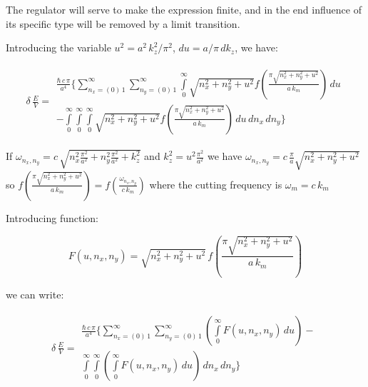 \documentclass[11pt]{article}
\begin{document}
    The regulator will serve to make the expression finite, and in the end
influence of its specific type will be removed by a limit transition.

    Introducing the variable \(u^2 = a^2\,k_z^2/\pi^2\),
\(du = a/\pi\,dk_z\), we have:

    \begin{equation}
\begin{array}{lr}
\delta\,\frac{E}{V} =
\begin{array}{c}
\frac{\hbar\,c\,\pi}{a^4}\Bigg\{
\sum\limits_{n_x=\left(0\right)\,1}^{\infty}
\sum\limits_{n_y=\left(0\right)\,1}^{\infty}
\int\limits_{0}^{\infty}
{\sqrt{n_x^2 + n_y^2 + u^2}}
f\left(\frac{\pi\sqrt{n_x^2 + n_y^2 + u^2}}{a\,k_m}\right)
\,d{u} \\
- \int\limits_{0}^{\infty}
\int\limits_{0}^{\infty}
\int\limits_{0}^{\infty}
{\sqrt{n_x^2 + n_y^2 + u^2}}
f\left(\frac{\pi\sqrt{n_x^2 + n_y^2 + u^2}}{a\,k_m}\right)
\,d{u}\,d{n_x}\,d{n_y}
\Bigg\}
\end{array}
\end{array}
\end{equation}

    If
\(\omega _{n_x,n_y} = c\,\sqrt{n_x^2\frac{\pi^2}{a^2}+n_y^2\frac{\pi^2}{a^2}+k_z^2}\)
and \(k_z^2 = u^2 \frac{\pi^2}{a^2}\) we have
\(\omega _{n_x,n_y} = c \, \frac{\pi}{a} \sqrt{n_x^2+n_y^2+u^2}\) so
\(f\left(\frac{\pi\sqrt{n_x^2 + n_y^2+u^2}}{a\,k_m}\right) = f\left(\frac{\omega _{n_x,n_y}}{c\,k_m}\right)\)
where the cutting frequency is \(\omega_m = c\,k_m\)

    Introducing function:

    \begin{equation}
F\left(u, n_x, n_y\right) = 
\sqrt{n_x^2 + n_y^2+u^2}\,
f\left(\frac{\pi\sqrt{n_x^2 + n_y^2+u^2}}{a\,k_m}\right)
\end{equation}

    we can write:

    \begin{equation}
\begin{array}{lr}
\delta\,\frac{E}{V} =
\begin{array}{c}
\frac{\hbar\,c\,\pi}{a^4}
\Bigg\{
\sum\limits_{n_x=\left(0\right)\,1}^{\infty}
\sum\limits_{n_y=\left(0\right)\,1}^{\infty}
\left(\int\limits_{0}^{\infty}F\left(u, n_x, n_y\right)\,d{u}\right)
- \\
\int\limits_{0}^{\infty}
\int\limits_{0}^{\infty}
\left(\int\limits_{0}^{\infty}F\left(u, n_x, n_y\right)\,d{u}\right)
\,d{n_x}\,d{n_y}
\Bigg\}
\end{array}
\end{array}
\end{equation}
\end{document}
